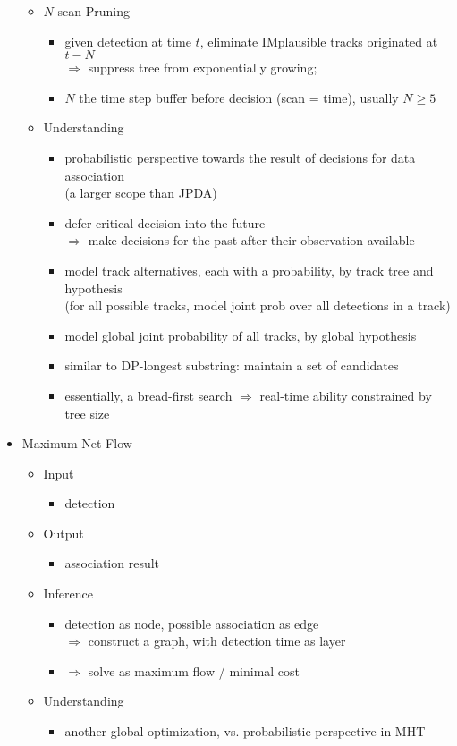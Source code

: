 \begin{itemize}
\begin{itemize}
\begin{itemize}
		\end{itemize}
	\item $N$-scan Pruning
		\begin{itemize}
		\item given detection at time $t$, eliminate IMplausible tracks originated at $t-N$ \\
		$\Rightarrow$ suppress tree from exponentially growing;
		\item $N$ the time step buffer before decision (scan = time), usually $N\ge 5$
		\end{itemize}
	\item Understanding
		\begin{itemize}
		\item probabilistic perspective towards the result of decisions for data association \\
		(a larger scope than JPDA)
		\item defer critical decision into the future \\
		$\Rightarrow$ make decisions for the past after their observation available
		\item model track alternatives, each with a probability, by track tree and hypothesis \\ 
		(for all possible tracks, model joint prob over all detections in a track)
		\item model global joint probability of all tracks, by global hypothesis
		\item similar to DP-longest substring: maintain a set of candidates
		\item essentially, a bread-first search $\Rightarrow$ real-time ability constrained by tree size 
		\end{itemize}
	\end{itemize}

\item Maximum Net Flow
	\begin{itemize}
	\item Input
		\begin{itemize}
		\item detection
		\end{itemize}
	\item Output
		\begin{itemize}
		\item association result
		\end{itemize}
	\item Inference
		\begin{itemize}
		\item detection as node, possible association as edge \\
		$\Rightarrow$ construct a graph, with detection time as layer
		\item $\Rightarrow$ solve as maximum flow / minimal cost
		\end{itemize}
	\item Understanding
		\begin{itemize}
		\item another global optimization, vs. probabilistic perspective in MHT
		\end{itemize}
	\end{itemize}


\end{itemize}
